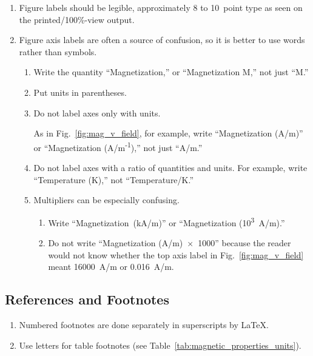 \begin{enumerate}
	\item Figure labels should be legible, approximately 8 to 10~point type as seen on the printed/100\%-view output.
	
	\item Figure axis labels are often a source of confusion, so it is better to use words rather than symbols.
	
	\begin{enumerate}
		\item Write the quantity ``Magnetization,'' or ``Magnetization M,'' not just ``M.'' 
	 
		\item Put units in parentheses. 
		
		\item Do not label axes only with units. 
		
		As in Fig.~\ref{fig:mag_v_field}, for example, write ``Magnetization (A/m)'' or ``Magnetization (A/m\textsuperscript{-1}),'' not just ``A/m.'' 
		
		\item Do not label axes with a ratio of quantities and units. For example, write ``Temperature (K),'' not ``Temperature/K.'' 
		
		\item Multipliers can be especially confusing. 
			
		\begin{enumerate}
			\item 	Write ``Magnetization~(kA/m)'' or ``Magnetization (10\textsuperscript{3}~A/m).'' 
			
			\item Do not write ``Magnetization (A/m)~$\times$~1000'' because the reader would not know whether the top axis label in Fig.~\ref{fig:mag_v_field} meant 16000~A/m or 0.016~A/m. 
		\end{enumerate}
		
	\end{enumerate}	
		
\end{enumerate}




\subsection{References and Footnotes}

\begin{enumerate}
	\item Numbered footnotes are done separately in superscripts by \LaTeX.  
	
	\item Use letters for table footnotes (see Table~\ref{tab:magnetic_properties_units}).

\end{enumerate}





